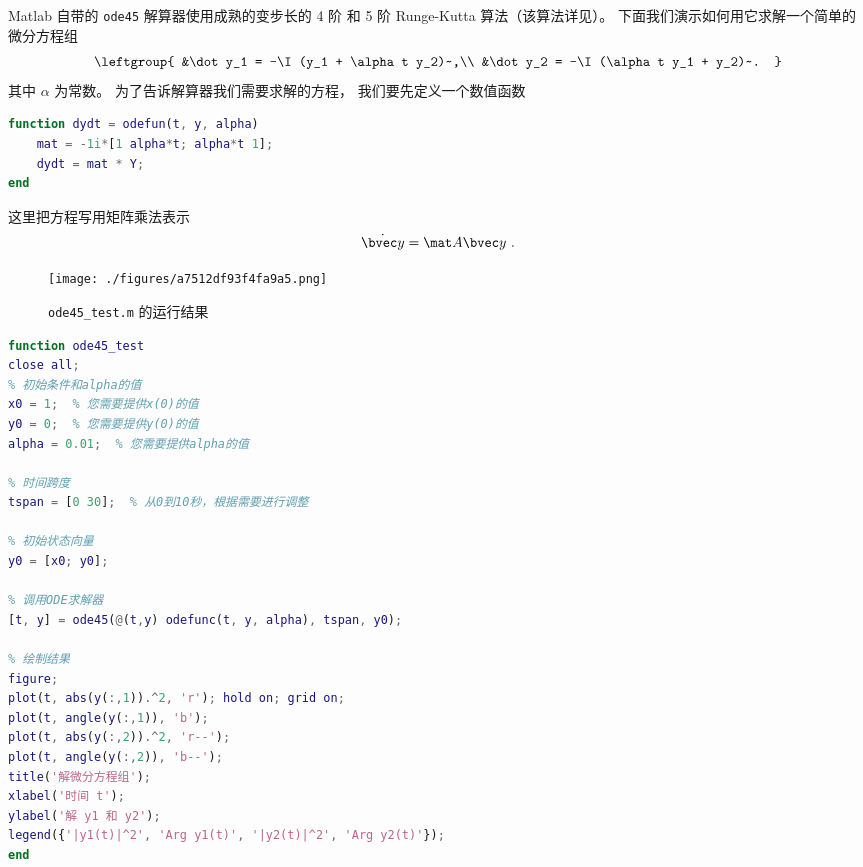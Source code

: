 
Matlab 自带的 \verb`ode45` 解算器使用成熟的变步长的 4 阶 和 5 阶 Runge-Kutta 算法（该算法详见）。 下面我们演示如何用它求解一个简单的微分方程组
\begin{equation}
\leftgroup{
&\dot y_1 = -\I (y_1 + \alpha t y_2)~,\\
&\dot y_2 = -\I (\alpha t y_1 + y_2)~.
}\end{equation}
其中 $\alpha$ 为常数。 为了告诉解算器我们需要求解的方程， 我们要先定义一个数值函数
\begin{lstlisting}[language=matlab,caption=odefun.m]
function dydt = odefun(t, y, alpha)
    mat = -1i*[1 alpha*t; alpha*t 1];
    dydt = mat * Y;
end
\end{lstlisting}
这里把方程写用矩阵乘法表示
\begin{equation}
\dot{\bvec y} = \mat A \bvec y~.
\end{equation}


\begin{figure}[ht]
\centering
\texttt{[image: ./figures/a7512df93f4fa9a5.png]}
\caption{\verb|ode45_test.m| 的运行结果} \label{fig_MatODE_2}
\end{figure}

\begin{lstlisting}[language=matlab,caption=ode45\_test.m]
function ode45_test
close all;
% 初始条件和alpha的值
x0 = 1;  % 您需要提供x(0)的值
y0 = 0;  % 您需要提供y(0)的值
alpha = 0.01;  % 您需要提供alpha的值

% 时间跨度
tspan = [0 30];  % 从0到10秒，根据需要进行调整

% 初始状态向量
y0 = [x0; y0];

% 调用ODE求解器
[t, y] = ode45(@(t,y) odefunc(t, y, alpha), tspan, y0);

% 绘制结果
figure;
plot(t, abs(y(:,1)).^2, 'r'); hold on; grid on;
plot(t, angle(y(:,1)), 'b');
plot(t, abs(y(:,2)).^2, 'r--');
plot(t, angle(y(:,2)), 'b--');
title('解微分方程组');
xlabel('时间 t');
ylabel('解 y1 和 y2');
legend({'|y1(t)|^2', 'Arg y1(t)', '|y2(t)|^2', 'Arg y2(t)'});
end
\end{lstlisting}


